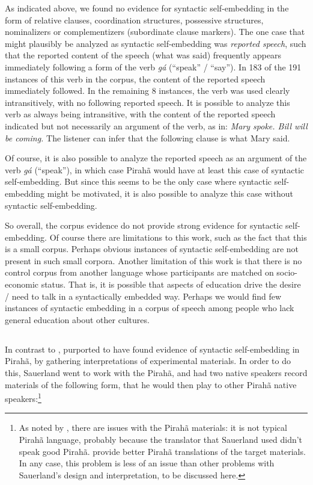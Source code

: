\documentclass{article}
\begin{document}
As indicated above, we found no evidence for syntactic self-embedding in the form of relative clauses, coordination structures, possessive structures, nominalizers or complementizers (subordinate clause markers). The one case that might plausibly be analyzed as syntactic self-embedding was \textit{reported speech}, such that the reported content of the speech (what was said) frequently appears immediately following a form of the verb \textit{gá} (``speak'' / ``say''). In 183 of the 191 instances of this verb in the corpus, the content of the reported speech immediately followed. In the remaining 8 instances, the verb was used clearly intransitively, with no following reported speech. It is possible to analyze this verb as always being intransitive, with the content of the reported speech indicated but not necessarily an argument of the verb, as in:  \textit{Mary spoke.  Bill will be coming.}  The listener can infer that the following clause is what Mary said.  

Of course, it is also possible to analyze the reported speech as an argument of the verb \textit{gá} (``speak''), in which case Pirahã would have at least this case of syntactic self-embedding.  But since this seems to be the only case where syntactic self-embedding might be motivated, it is also possible to analyze this case without syntactic self-embedding.

So overall, the corpus evidence do not provide strong evidence for syntactic self-embedding. Of course there are limitations to this work, such as the fact that this is a small corpus.  Perhaps obvious instances of syntactic self-embedding are not present in such small corpora.  Another limitation of this work is that there is no control corpus from another language whose participants are matched on socio-economic status.  That is, it is possible that aspects of education drive the desire / need to talk in a syntactically embedded way.  Perhaps we would find few instances of syntactic embedding in a corpus of speech among people who lack general education about other cultures.

\subsection{\cite{sauerland2018false}}
\label{sauerland_sec}

In contrast to \cite{futrell2016corpus}, \cite{sauerland2018false} purported to have found evidence of syntactic self-embedding in Pirahã, by gathering interpretations of experimental materials. In order to do this, Sauerland went to work with the Pirahã, and had two native speakers record materials of the following form, that he would then play to other Pirahã native speakers:\footnote{As noted by \cite{everett2019recursion}, there are issues with the Pirahã materials: it is not typical Pirahã language, probably because the translator that Sauerland used didn't speak good Pirahã. \cite{everett2019recursion} provide better Pirahã translations of the target materials. In any case, this problem is less of an issue than other problems with Sauerland's design and interpretation, to be discussed here.}
\end{document}
